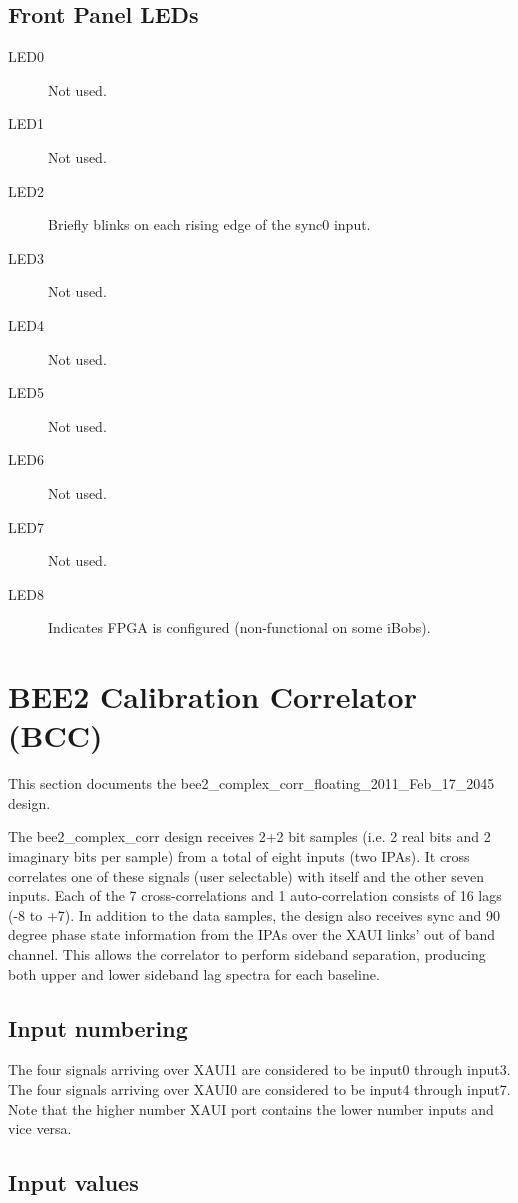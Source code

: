 \documentclass[12pt]{article}
\begin{document}
\filbreak
  \subsection{Front Panel LEDs}
\begin{description}
\item[LED0] Not used.
\item[LED1] Not used.
\item[LED2] Briefly blinks on each rising edge of the sync0 input.
\item[LED3] Not used.
\item[LED4] Not used.
\item[LED5] Not used.
\item[LED6] Not used.
\item[LED7] Not used.
\item[LED8] Indicates FPGA is configured (non-functional on some iBobs).
\end{description}

\newpage
\section{BEE2 Calibration Correlator (BCC)}

This section documents the bee2\_complex\_corr\_floating\_2011\_Feb\_17\_2045
design.

The bee2\_complex\_corr design receives 2+2 bit samples (i.e. 2 real bits and 2
imaginary bits per sample) from a total of eight inputs (two IPAs).  It cross
correlates one of these signals (user selectable) with itself and the other
seven inputs.  Each of the 7 cross-correlations and 1 auto-correlation consists
of 16 lags (-8 to +7).  In addition to the data samples, the design also
receives sync and 90 degree phase state information from the IPAs over the XAUI
links' out of band channel.  This allows the correlator to perform sideband
separation, producing both upper and lower sideband lag spectra for each
baseline.

\subsection{Input numbering}

The four signals arriving over XAUI1 are considered to be input0 through
input3.  The four signals arriving over XAUI0 are considered to be input4
through input7.  Note that the higher number XAUI port contains the lower
number inputs and vice versa.

\subsection{Input values}
\end{document}
